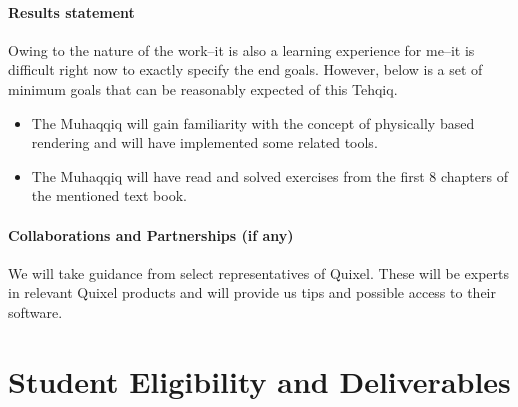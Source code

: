 \documentclass{article}
\begin{document}
\paragraph{Results statement} Owing to the nature of the work--it is also a learning experience for me--it is difficult right now to exactly specify the end goals. However, below is a set of minimum goals that can be reasonably expected of this Tehqiq.
\begin{itemize}
  \item The Muhaqqiq will gain familiarity with the concept of physically based rendering and will have implemented some related tools.
  \item The Muhaqqiq will have read and solved exercises from the first 8 chapters of the mentioned text book.
\end{itemize}
\paragraph{Collaborations and Partnerships (if any)} We will take guidance from select representatives of Quixel. These will be experts in relevant Quixel products and will provide us tips and possible access to their software.

\newpage

\section{Student Eligibility and Deliverables}
\label{sec:timeline}


\end{document}
